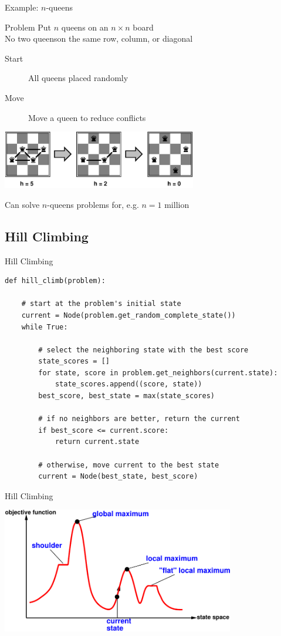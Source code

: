 \documentclass[14pt]{beamer}
\begin{document}
\begin{frame}{Example: $n$-queens}
\begin{block}{Problem}
Put $n$ queens on an $n \times n$ board \\
No two queenson the same row, column, or diagonal
\end{block}
\begin{description}
\item[Start] All queens placed randomly
\item[Move] Move a queen to reduce conflicts
\end{description}
\begin{center}
\includegraphics[height=1in]{4-queens-iterative.pdf}
\end{center}
Can solve $n$-queens problems for, e.g. $n = 1$ million
\end{frame}


\subsection{Hill Climbing}


\begin{frame}[fragile]{Hill Climbing}
\scriptsize
\begin{lstlisting}
def hill_climb(problem):

    # start at the problem's initial state
    current = Node(problem.get_random_complete_state())
    while True:

        # select the neighboring state with the best score
        state_scores = []
        for state, score in problem.get_neighbors(current.state):
            state_scores.append((score, state))
        best_score, best_state = max(state_scores)

        # if no neighbors are better, return the current
        if best_score <= current.score:
            return current.state

        # otherwise, move current to the best state
        current = Node(best_state, best_score)
\end{lstlisting}
\end{frame}


\begin{frame}{Hill Climbing}
\begin{center}
\includegraphics[width=4in]{hill-climbing.pdf}
\end{center}
\end{frame}
\end{document}
